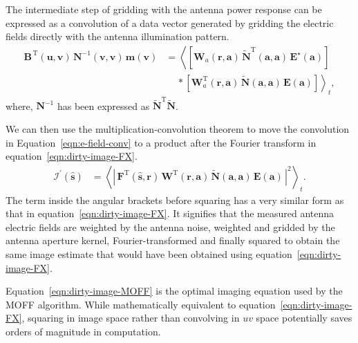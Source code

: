\documentclass[a4paper,fleqn,usenatbib]{mnras}
\begin{document}
The intermediate step of gridding with the antenna power response can be expressed as a convolution of a data vector generated by gridding the electric fields directly with the antenna illumination pattern.
\begin{align}
\mathbf{B}^{\,\textrm{T}}(\mathbf{u},\mathbf{v})\,\mathbf{N}^{-1}(\mathbf{v} ,\mathbf{v})\,\mathbf{m}(\mathbf{v}) &= \left\langle \left[\mathbf{W}_a(\mathbf{r},\mathbf{a})\,\widetilde{\mathbf{N}}^\textrm{T}\!(\mathbf{a},\mathbf{a})\, \mathbf{E}^\star(\mathbf{a})\right]\right. \nonumber\\ 
&\,\quad\ast\left.\left[\mathbf{W}^\textrm{T}_a(\mathbf{r},\mathbf{a})\,\widetilde{\mathbf{N}}\!(\mathbf{a},\mathbf{a})\,\mathbf{E}(\mathbf{a})\right]\right\rangle_t, \label{eqn:e-field-conv}
\end{align}
where, $\mathbf{N}^{-1}$ has been expressed as $\widetilde{\mathbf{N}}^\textrm{T}\widetilde{\mathbf{N}}$.

We can then use the multiplication-convolution theorem to move the convolution in Equation~\ref{eqn:e-field-conv} to a product after the Fourier transform in equation~\ref{eqn:dirty-image-FX}.
\begin{align}
  \boldsymbol{\mathcal{I}}^\prime(\hat{\mathbf{s}}) &= \left\langle \left|\,\mathbf{F}^\textrm{T}(\hat{\mathbf{s}},\mathbf{r})\,\mathbf{W}^\textrm{T}(\mathbf{r},\mathbf{a})\,\widetilde{\mathbf{N}}(\mathbf{a},\mathbf{a})\,\mathbf{E}(\mathbf{a})\,\right|^2\right\rangle_t. \label{eqn:dirty-image-MOFF}
\end{align}
The term inside the angular brackets before squaring has a very similar form as that in equation~\ref{eqn:dirty-image-FX}. It signifies that the measured antenna electric fields are weighted by the antenna noise, weighted and gridded by the antenna aperture kernel, Fourier-transformed and finally squared to obtain the same image estimate that would have been obtained using equation~\ref{eqn:dirty-image-FX}. 

Equation~\ref{eqn:dirty-image-MOFF} is the optimal imaging equation used by the MOFF algorithm. While mathematically equivalent to equation~\ref{eqn:dirty-image-FX}, squaring in image space rather than convolving in $uv$ space potentially saves orders of magnitude in computation.
\end{document}
